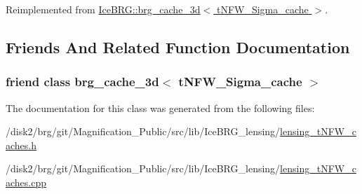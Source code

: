 Reimplemented from \hyperlink{classIceBRG_1_1brg__cache__3d_af934bb6a675f2a38b4da4092b35c6120}{Ice\-B\-R\-G\-::brg\-\_\-cache\-\_\-3d$<$ t\-N\-F\-W\-\_\-\-Sigma\-\_\-cache $>$}.



\subsection{Friends And Related Function Documentation}
\hypertarget{classIceBRG_1_1tNFW__Sigma__cache_a55fa430ea2bcfdde9110c10b1511d4d0}{
\subsubsection[{brg\-\_\-cache\-\_\-3d$<$ t\-N\-F\-W\-\_\-\-Sigma\-\_\-cache $>$}]{\setlength{\rightskip}{0pt plus 5cm}friend class {\bf brg\-\_\-cache\-\_\-3d}$<$ {\bf t\-N\-F\-W\-\_\-\-Sigma\-\_\-cache} $>$\hspace{0.3cm}{\ttfamily [friend]}}}\label{classIceBRG_1_1tNFW__Sigma__cache_a55fa430ea2bcfdde9110c10b1511d4d0}


The documentation for this class was generated from the following files\-:\begin{DoxyCompactItemize}
\item 
/disk2/brg/git/\-Magnification\-\_\-\-Public/src/lib/\-Ice\-B\-R\-G\-\_\-lensing/\hyperlink{lensing__tNFW__caches_8h}{lensing\-\_\-t\-N\-F\-W\-\_\-caches.\-h}\item 
/disk2/brg/git/\-Magnification\-\_\-\-Public/src/lib/\-Ice\-B\-R\-G\-\_\-lensing/\hyperlink{lensing__tNFW__caches_8cpp}{lensing\-\_\-t\-N\-F\-W\-\_\-caches.\-cpp}\end{DoxyCompactItemize}
